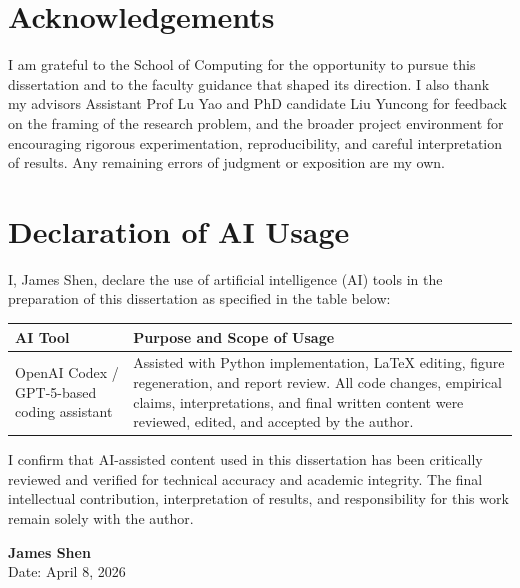 \documentclass[12pt]{report}
\begin{document}
\cleardoublepage
\chapter*{Acknowledgements}
I am grateful to the School of Computing for the opportunity to pursue this dissertation and to the faculty guidance that shaped its direction. I also thank my advisors Assistant Prof Lu Yao and PhD candidate Liu Yuncong for feedback on the framing of the research problem, and the broader project environment for encouraging rigorous experimentation, reproducibility, and careful interpretation of results. Any remaining errors of judgment or exposition are my own.

\cleardoublepage
\chapter*{Declaration of AI Usage}
I, James Shen, declare the use of artificial intelligence (AI) tools in the preparation of this dissertation as specified in the table below:

\begin{table}[H]
\centering
\renewcommand{\arraystretch}{1.18}
\begin{tabularx}{0.95\textwidth}{|>{\RaggedRight\arraybackslash}p{}|>{\RaggedRight\arraybackslash}X|}
\hline
\textbf{AI Tool} & \textbf{Purpose and Scope of Usage} \\
\hline
OpenAI Codex / GPT-5-based coding assistant & Assisted with Python implementation, LaTeX editing, figure regeneration, and report review. All code changes, empirical claims, interpretations, and final written content were reviewed, edited, and accepted by the author. \\
\hline
\end{tabularx}
\end{table}

I confirm that AI-assisted content used in this dissertation has been critically reviewed and verified for technical accuracy and academic integrity. The final intellectual contribution, interpretation of results, and responsibility for this work remain solely with the author.

\vspace{2.0cm}
\noindent\makebox[0.32\textwidth]{\hrulefill}

\noindent\textbf{James Shen}\\
Date: April 8, 2026
\end{document}
